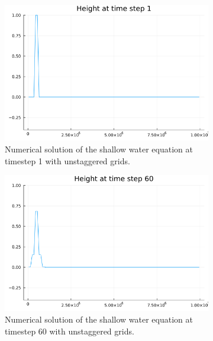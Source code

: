 \begin{figure}[h]
    \centering

    \begin{subfigure}[b]{0.3\textwidth}
        \includegraphics[width=\textwidth]{./images/height-swe1d-unstaggered-grid-1.png}
        \caption{Numerical solution of the shallow water equation at timestep 1 with unstaggered grids.}
        \label{fig:unstaggered1}
    \end{subfigure}
    \hfill
    \begin{subfigure}[b]{0.3\textwidth}
        \includegraphics[width=\textwidth]{./images/height-swe1d-unstaggered-grid-60.png}
        \caption{Numerical solution of the shallow water equation at timestep 60 with unstaggered grids.}
        \label{fig:unstaggered60}
    \end{subfigure}
    \hfill
    \begin{subfigure}[b]{0.3\textwidth}

\end{subfigure}
\end{figure}
